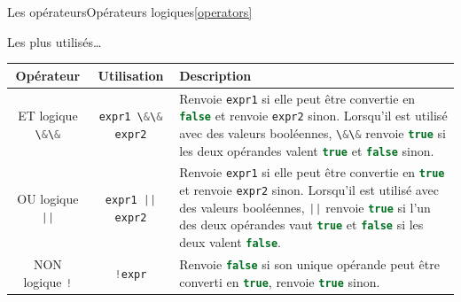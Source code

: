 \documentclass{beamer}
\begin{document}
    \begin{frame}{Les opérateurs}{Opérateurs logiques\cref{operators}}
        \begin{scriptsize}
            Les plus utilisés\ldots
            \begin{table}[h!]
                \centering
                \begin{tabular}{|c|c|p{7cm}|}
                    \hline
                    \textbf{Opérateur}                               & \textbf{Utilisation}                              & \textbf{Description}                                                                                                                                                                                                                                                                                                                                                                                                                                                                         \\
                    \hline
                    ET logique \lstinline[language=Javascript]!\&\&! & \lstinline[language=Javascript]!expr1 \&\& expr2! & Renvoie \lstinline[language=Javascript]!expr1! si elle peut être convertie en \lstinline[language=Javascript]!false! et renvoie \lstinline[language=Javascript]!expr2! sinon. Lorsqu'il est utilisé avec des valeurs booléennes, \lstinline[language=Javascript]!\&\&! renvoie \lstinline[language=Javascript]!true! si les deux opérandes valent \lstinline[language=Javascript]!true! et \lstinline[language=Javascript]!false! sinon.                                                     \\
                    \hline
                    OU logique \lstinline[language=Javascript]!||!   & \lstinline[language=Javascript]!expr1 || expr2!   & Renvoie \lstinline[language=Javascript]!expr1! si elle peut être convertie en \lstinline[language=Javascript]!true! et renvoie \lstinline[language=Javascript]!expr2! sinon. Lorsqu'il est utilisé avec des valeurs booléennes, \lstinline[language=Javascript]!||! renvoie \lstinline[language=Javascript]!true! si l'un des deux opérandes vaut \lstinline[language=Javascript]!true! et \lstinline[language=Javascript]!false! si les deux valent \lstinline[language=Javascript]!false!. \\
                    \hline
                    NON logique \lstinline[language=Javascript]|!|   & \lstinline[language=Javascript]|!expr|            & Renvoie \lstinline[language=Javascript]!false! si son unique opérande peut être converti en \lstinline[language=Javascript]!true!, renvoie \lstinline[language=Javascript]!true! sinon.                                                                                                                                                                                                                                                                                                      \\

\end{tabular}
\end{table}
\end{scriptsize}
\end{frame}
\end{document}
